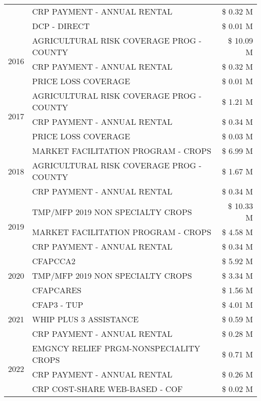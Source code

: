 \begin{tabular}{llr}
 & CRP PAYMENT - ANNUAL RENTAL & \$ 0.32 M \\
 & DCP - DIRECT & \$ 0.01 M \\
\cline{1-3}
\multirow[t]{3}{*}{2016} & AGRICULTURAL RISK COVERAGE PROG - COUNTY & \$ 10.09 M \\
 & CRP PAYMENT - ANNUAL RENTAL & \$ 0.32 M \\
 & PRICE LOSS COVERAGE & \$ 0.01 M \\
\cline{1-3}
\multirow[t]{3}{*}{2017} & AGRICULTURAL RISK COVERAGE PROG - COUNTY & \$ 1.21 M \\
 & CRP PAYMENT - ANNUAL RENTAL & \$ 0.34 M \\
 & PRICE LOSS COVERAGE & \$ 0.03 M \\
\cline{1-3}
\multirow[t]{3}{*}{2018} & MARKET FACILITATION PROGRAM - CROPS & \$ 6.99 M \\
 & AGRICULTURAL RISK COVERAGE PROG - COUNTY & \$ 1.67 M \\
 & CRP PAYMENT - ANNUAL RENTAL & \$ 0.34 M \\
\cline{1-3}
\multirow[t]{3}{*}{2019} & TMP/MFP 2019 NON SPECIALTY CROPS & \$ 10.33 M \\
 & MARKET FACILITATION PROGRAM - CROPS & \$ 4.58 M \\
 & CRP PAYMENT - ANNUAL RENTAL & \$ 0.34 M \\
\cline{1-3}
\multirow[t]{3}{*}{2020} & CFAPCCA2 & \$ 5.92 M \\
 & TMP/MFP 2019 NON SPECIALTY CROPS & \$ 3.34 M \\
 & CFAPCARES & \$ 1.56 M \\
\cline{1-3}
\multirow[t]{3}{*}{2021} & CFAP3 - TUP & \$ 4.01 M \\
 & WHIP PLUS 3 ASSISTANCE & \$ 0.59 M \\
 & CRP PAYMENT - ANNUAL RENTAL & \$ 0.28 M \\
\cline{1-3}
\multirow[t]{3}{*}{2022} & EMGNCY RELIEF PRGM-NONSPECIALITY CROPS & \$ 0.71 M \\
 & CRP PAYMENT - ANNUAL RENTAL & \$ 0.26 M \\
 & CRP COST-SHARE WEB-BASED - COF & \$ 0.02 M \\
\cline{1-3}
\bottomrule
\end{tabular}
